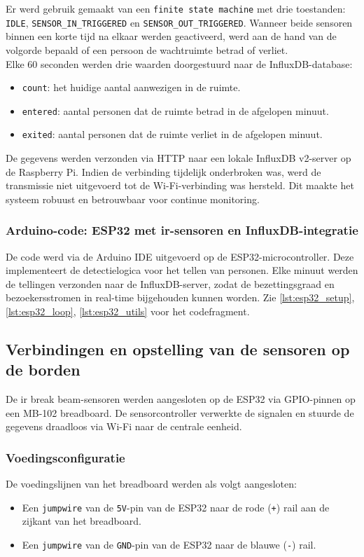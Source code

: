Er werd gebruik gemaakt van een \texttt{finite state machine} met drie toestanden: \texttt{IDLE}, \texttt{SENSOR\_IN\_TRIGGERED} en \texttt{SENSOR\_OUT\_TRIGGERED}. Wanneer beide sensoren binnen een korte tijd na elkaar werden geactiveerd, werd aan de hand van de volgorde bepaald of een persoon de wachtruimte betrad of verliet.  \\

Elke 60 seconden werden drie waarden doorgestuurd naar de InfluxDB-database:
\begin{itemize}
    \item \texttt{count}: het huidige aantal aanwezigen in de ruimte.
    \item \texttt{entered}: aantal personen dat de ruimte betrad in de afgelopen minuut.
    \item \texttt{exited}: aantal personen dat de ruimte verliet in de afgelopen minuut.
\end{itemize}

De gegevens werden verzonden via HTTP naar een lokale InfluxDB v2-server op de Raspberry Pi. Indien de verbinding tijdelijk onderbroken was, werd de transmissie niet uitgevoerd tot de Wi-Fi-verbinding was hersteld. Dit maakte het systeem robuust en betrouwbaar voor continue monitoring.
 
\subsubsection{Arduino-code: ESP32 met \gls{ir}-sensoren en InfluxDB-integratie} 
De code werd via de Arduino IDE uitgevoerd op de ESP32-microcontroller. Deze implementeert de detectielogica voor het tellen van personen. Elke minuut werden de tellingen verzonden naar de InfluxDB-server, zodat de bezettingsgraad en bezoekersstromen in real-time bijgehouden kunnen worden. Zie \ref{lst:esp32_setup},  \ref{lst:esp32_loop}, \ref{lst:esp32_utils} voor het codefragment.

\subsection{Verbindingen en opstelling van de sensoren op de borden}
De \gls{ir} break beam-sensoren werden aangesloten op de ESP32 via GPIO-pinnen op een MB-102 breadboard. De sensorcontroller verwerkte de signalen en stuurde de gegevens draadloos via Wi-Fi naar de centrale eenheid.

\subsubsection{Voedingsconfiguratie}
De voedingslijnen van het breadboard werden als volgt aangesloten:
\begin{itemize}
    \item Een \texttt{jumpwire} van de \texttt{5V}-pin van de ESP32 naar de rode (\texttt{+}) rail aan de zijkant van het breadboard.
    \item Een \texttt{jumpwire} van de \texttt{GND}-pin van de ESP32 naar de blauwe (\texttt{-}) rail.
\end{itemize}

